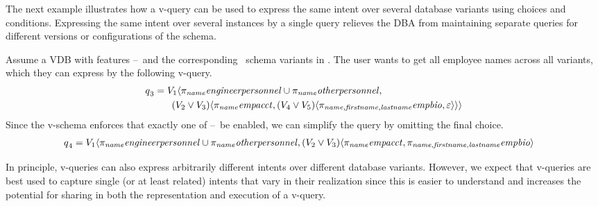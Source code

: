 The next example illustrates how a v-query can be used to express the same
intent over several database variants using choices and conditions. Expressing
the same intent over several instances by a single query relieves the DBA from
maintaining separate queries for different versions or configurations of the
schema.

\begin{example}
\label{eg:vq-same-intent-mult-vars}
Assume a VDB with features \vOne--\vFive\ and the corresponding \basic\ schema
variants in . The user wants to get all employee names across all
variants, which they can express by the following v-query.
%
\begin{align*}
\vQ_3 &= 
  \vOne\chcL
    \pi_{\name}\engemp \cup \pi_{\name}\othemp, \\
 & \hspace{18pt}
    (\vTwo\vee\vThree)\chcL
      \pi_{\name}\empacct, 
      \chc[(\vFour\vee\vFive)]{\pi_{\name,\fname,\lname}\empbio, \emp}\chcR\chcR
\end{align*}
%
Since the v-schema enforces that exactly one of \vOne--\vFive\ be enabled, we
can simplify the query by omitting the final choice.
%
\begin{align*}
\vQ_4 &= 
  \vOne\chcL
    \pi_{\name}\engemp \cup \pi_{\name}\othemp, 
    \chc[(\vTwo\vee\vThree)]{
      \pi_{\name}\empacct,
      \pi_{\name,\fname,\lname}\empbio}
\end{align*}
%
\end{example}

In principle, v-queries can also express arbitrarily different intents over
different database variants. However, we expect that v-queries are best used to
capture single (or at least related) intents that vary in their realization
since this is easier to understand and increases the potential for sharing in
both the representation and execution of a v-query.






